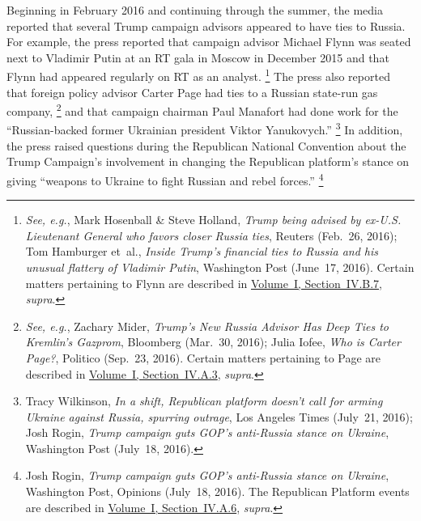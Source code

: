 Beginning in February 2016 and continuing through the summer, the media reported that several Trump campaign advisors appeared to have ties to Russia.
For example, the press reported that campaign advisor Michael Flynn was seated next to Vladimir Putin at an RT gala in Moscow in December 2015 and that Flynn had appeared regularly on RT as an analyst.%
\footnote{\textit{See, e.g.}, Mark Hosenball \& Steve Holland, \textit{Trump being advised by ex-U.S. Lieutenant General who favors closer Russia ties}, Reuters (Feb.~26, 2016);
Tom Hamburger et~al., \textit{Inside Trump's financial ties to Russia and his unusual flattery of Vladimir Putin}, Washington Post (June~17, 2016).
Certain matters pertaining to Flynn are described in \hyperlink{subsubsection.1.4.2.7}{Volume~I, Section~IV.B.7}, \textit{supra}.}
The press also reported that foreign policy advisor Carter Page had ties to a Russian state-run gas company,%
\footnote{\textit{See, e.g.}, Zachary Mider, \textit{Trump's New Russia Advisor Has Deep Ties to Kremlin's Gazprom}, Bloomberg (Mar.~30, 2016);
Julia Iofee, \textit{Who is Carter Page?}, Politico (Sep.~23, 2016).
Certain matters pertaining to Page are described in \hyperlink{subsubsection.1.4.1.3}{Volume~I, Section~IV.A.3}, \textit{supra}.}
and that campaign chairman Paul Manafort had done work for the ``Russian-backed former Ukrainian president Viktor Yanukovych.''%
\footnote{Tracy Wilkinson, \textit{In a shift, Republican platform doesn't call for arming Ukraine against Russia, spurring outrage}, Los Angeles Times (July~21, 2016);
Josh Rogin, \textit{Trump campaign guts GOP's anti-Russia stance on Ukraine}, Washington Post (July~18, 2016).}
In addition, the press raised questions during the Republican National Convention about the Trump Campaign's involvement in changing the Republican platform's stance on giving ``weapons to Ukraine to fight Russian and rebel forces.''%
\footnote{Josh Rogin, \textit{Trump campaign guts GOP's anti-Russia stance on Ukraine}, Washington Post, Opinions (July~18, 2016).
The Republican Platform events are described in \hyperlink{subsubsection.1.4.1.6}{Volume~I, Section~IV.A.6}, \textit{supra}.}

